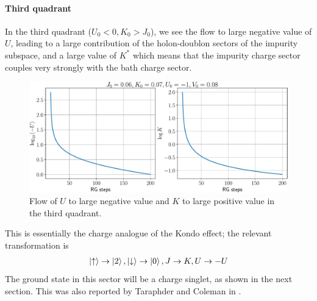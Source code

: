 \documentclass[12pt,twoside]{report}
\numberwithin{equation}{section}
\begin{document}
\paragraph*{Third quadrant}
In the third quadrant (\(U_0 < 0, K_0 > J_0\)), we see the flow to large negative value of \(U\), leading to a large contribution of the holon-doublon sectors of the impurity subspace, and a large value of \(K^*\) which means that the impurity charge sector couples very strongly with the bath charge sector.
\begin{figure}[htpb!]
\centering
\includegraphics[width=\textwidth]{../figures/with_V_q3.pdf}
\caption{Flow of \(U\) to large negative value and \(K\) to large positive value in the third quadrant.}
\label{frac_q3}
\end{figure}
This is essentially the charge analogue of the Kondo effect; the relevant transformation is
\begin{equation}\begin{aligned}
	\ket{\uparrow} \to \ket{2}, \ket{\downarrow} \to \ket{0}, J \to K, U \to -U
\end{aligned}\end{equation}
The ground state in this sector will be a charge singlet, as shown in the next section. This was also reported by Taraphder and Coleman in \cite{taraphder}.
\end{document}
